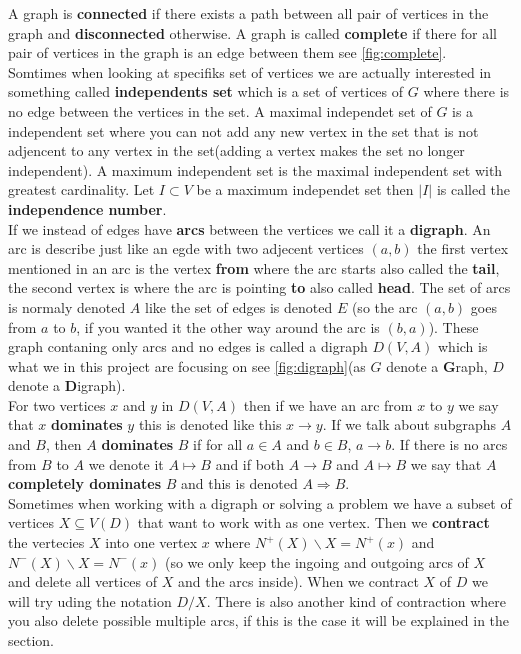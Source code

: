 A graph is \textbf{connected} if there exists a path between all pair of vertices in the graph and \textbf{disconnected} otherwise.
A graph is called \textbf{complete} if there for all pair of vertices in the graph is an edge between them see \autoref{fig:complete}.\\
Somtimes when looking at specifiks set of vertices we are actually interested in something called \textbf{independents set} which is a set of vertices of $G$ where there is no edge between the vertices in the set. A maximal independet set of $G$ is a independent set where you can not add any new vertex in the set that is not adjencent to any vertex in the set(adding a vertex makes the set no longer independent).  
A maximum independent set is the maximal independent set with greatest cardinality. 
Let $I\subset V$ be a maximum independet set then $|I|$ is called the \textbf{independence number}. \\ 

If we instead of edges have \textbf{arcs} between the vertices we call it a \textbf{digraph}.
An arc is describe just like an egde with two adjecent vertices $(a,b)$ the first vertex mentioned in an arc is the vertex \textbf{from} where the arc starts also called the \textbf{tail}, the second vertex is where the arc is pointing \textbf{to} also called \textbf{head}. The set of arcs is normaly denoted $A$ like the set of edges is denoted $E$ 
(so the arc $(a,b)$ goes from $a$ to $b$, if you wanted it the other way around the arc is $(b,a)$).
These graph contaning only arcs and no edges is called a digraph $D(V,A)$ which is what we in this project are focusing on see \autoref{fig:digraph}(as $G$ denote a \textbf{G}raph, $D$ denote a \textbf{D}igraph).\\
For two vertices $x$ and $y$ in $D(V,A)$ then if we have an arc from $x$ to $y$ we say that $x$ \textbf{dominates} $y$ this is denoted like this $x \rightarrow y$. If we talk about subgraphs $A$ and $B$, then $A$ \textbf{dominates} $B$ if for all $a\in A$ and $b\in B$, $a \rightarrow b$. If there is no arcs from $B$ to $A$ we denote it $A\mapsto B$ and if both $A\rightarrow B$ and $A \mapsto B$ we say that $A$ \textbf{completely dominates} $B$ and this is denoted $A\Rightarrow B$.\\ 

Sometimes when working with a digraph or solving a problem we have a subset of vertices $X\subseteq V(D)$ that want to work with as one vertex. 
Then we \textbf{contract} the vertecies $X$ into one vertex $x$ where $N^+(X)\backslash X=N^+(x)$ and $N^-(X)\backslash X=N^-(x)$ (so we only keep the ingoing and outgoing arcs of $X$ and delete all vertices of $X$ and the arcs inside). When we contract $X$ of $D$ we will try uding the notation $D/X$. There is also another kind of contraction where you also delete possible multiple arcs, if this is the case it will be explained in the section.\\

